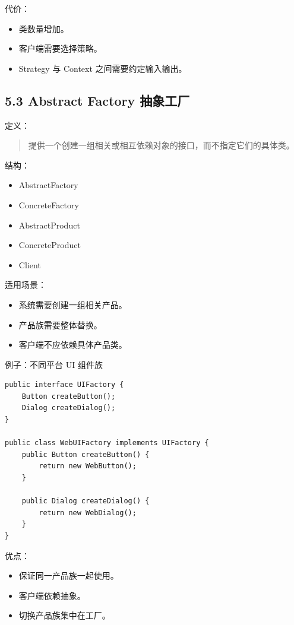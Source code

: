 \documentclass[UTF8,zihao=-4]{ctexart}
\begin{document}
代价：

\begin{itemize}
\item 类数量增加。
\item 客户端需要选择策略。
\item Strategy 与 Context 之间需要约定输入输出。
\end{itemize}

\subsection{5.3 Abstract Factory 抽象工厂}

定义：

\begin{quote}
提供一个创建一组相关或相互依赖对象的接口，而不指定它们的具体类。
\end{quote}

结构：

\begin{itemize}
\item AbstractFactory
\item ConcreteFactory
\item AbstractProduct
\item ConcreteProduct
\item Client
\end{itemize}

适用场景：

\begin{itemize}
\item 系统需要创建一组相关产品。
\item 产品族需要整体替换。
\item 客户端不应依赖具体产品类。
\end{itemize}

例子：不同平台 UI 组件族

\small
\begin{verbatim}
public interface UIFactory {
    Button createButton();
    Dialog createDialog();
}

public class WebUIFactory implements UIFactory {
    public Button createButton() {
        return new WebButton();
    }

    public Dialog createDialog() {
        return new WebDialog();
    }
}
\end{verbatim}
\normalsize

优点：

\begin{itemize}
\item 保证同一产品族一起使用。
\item 客户端依赖抽象。
\item 切换产品族集中在工厂。
\end{itemize}
\end{document}
